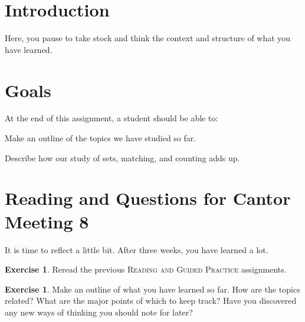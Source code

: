 \documentclass[12pt,letterpaper]{article}
\theoremstyle{definition}
\newtheorem{exercise}[question]{Exercise}
\begin{document}
\setlength{\parskip}{1ex plus 0.5ex minus 0.2ex}
\setlength{\parindent}{0pt}

\pagestyle{fancy}
\cfoot{}

\section*{Introduction}

Here, you pause to take stock and think the context and structure of what you have learned.

\section*{Goals}
At the end of this assignment, a student should be able to:
\begin{compactitem}
\item Make an outline of the topics we have studied so far.
\item Describe how our study of sets, matching, and counting adds up.
\end{compactitem}


\section*{Reading and Questions for Cantor Meeting 8}


It is time to reflect a little bit. After three weeks, you have learned a lot.

\begin{exercise}
Reread the previous \textsc{Reading and Guided Practice} assignments.
\end{exercise}

\begin{exercise}
Make an outline of what you have learned so far.
How are the topics related?
What are the major points of which to keep track?
Have you discovered any new ways of thinking you should note for later?
\end{exercise}
\end{document}
